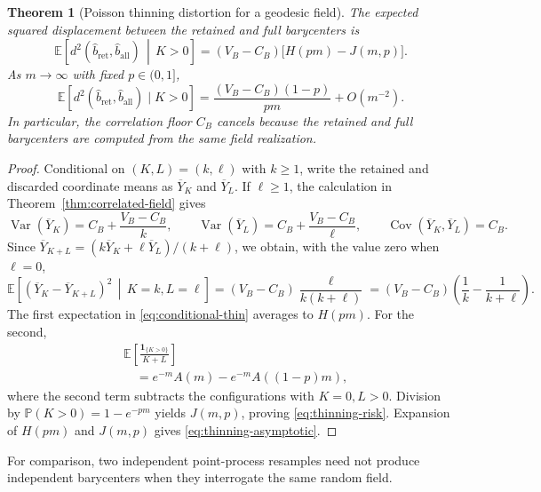 \documentclass[11pt,a4paper]{article}
\newtheorem{theorem}{Theorem}[section]
\theoremstyle{remark}
\newcommand{\EE}{\mathbb E}
\newcommand{\PP}{\mathbb P}
\DeclareMathOperator{\Cov}{Cov}
\DeclareMathOperator{\Var}{Var}
\begin{document}
\begin{theorem}[Poisson thinning distortion for a geodesic field]
\label{thm:thinning}
The expected squared displacement between the retained and full barycenters is
\begin{equation}
\label{eq:thinning-risk}
 \EE\!\left[d^2(\widehat b_{\mathrm{ret}},\widehat b_{\mathrm{all}})\,\middle|\,K>0\right]
 =(V_B-C_B)\bigl[H(pm)-J(m,p)\bigr].
\end{equation}
As \(m\to\infty\) with fixed \(p\in(0,1]\),
\begin{equation}
\label{eq:thinning-asymptotic}
 \EE[d^2(\widehat b_{\mathrm{ret}},\widehat b_{\mathrm{all}})\mid K>0]
 =\frac{(V_B-C_B)(1-p)}{pm}+O(m^{-2}).
\end{equation}
In particular, the correlation floor \(C_B\) cancels because the retained and full barycenters are computed from the same field realization.
\end{theorem}

\begin{proof}
Conditional on \((K,L)=(k,\ell)\) with \(k\ge1\), write the retained and discarded coordinate means as \(\overline Y_K\) and \(\overline Y_L\).  If \(\ell\ge1\), the calculation in Theorem~\ref{thm:correlated-field} gives
\[
 \Var(\overline Y_K)=C_B+\frac{V_B-C_B}{k},\qquad
 \Var(\overline Y_L)=C_B+\frac{V_B-C_B}{\ell},\qquad
 \Cov(\overline Y_K,\overline Y_L)=C_B.
\]
Since
\(
 \overline Y_{K+L}=(k\overline Y_K+\ell\overline Y_L)/(k+\ell)
\), we obtain, with the value zero when \(\ell=0\),
\begin{equation}
\label{eq:conditional-thin}
 \EE\!\left[(\overline Y_K-\overline Y_{K+L})^2\,\middle|\,K=k,L=\ell\right]
 =(V_B-C_B)\frac{\ell}{k(k+\ell)}
 =(V_B-C_B)\left(\frac1k-\frac1{k+\ell}\right).
\end{equation}
The first expectation in \eqref{eq:conditional-thin} averages to \(H(pm)\).  For the second,
\begin{align*}
 &\EE\!\left[\frac{\mathbf1_{\{K>0\}}}{K+L}\right]\\
 &\quad=e^{-m}A(m)-e^{-m}A((1-p)m),
\end{align*}
where the second term subtracts the configurations with \(K=0,L>0\).  Division by \(\PP(K>0)=1-e^{-pm}\) yields \(J(m,p)\), proving \eqref{eq:thinning-risk}.  Expansion of \(H(pm)\) and \(J(m,p)\) gives \eqref{eq:thinning-asymptotic}.
\end{proof}

For comparison, two independent point-process resamples need not produce independent barycenters when they interrogate the same random field.
\end{document}
